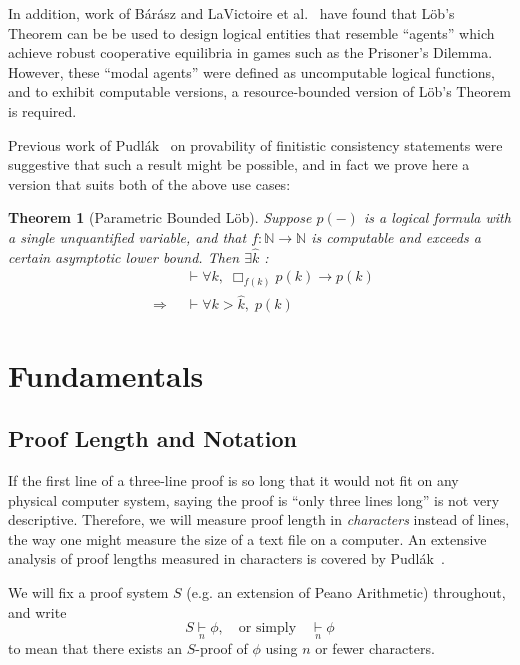 \documentclass[onecolumn]{miri-tech-article}
\newtheorem*{theorem*}{Theorem}
\numberwithin{equation}{section}
\theoremstyle{definition}
\newcommand{\NN}{\mathbb{N}}
\newcommand{\proves}[1]{\underset{#1}{\vdash}}
\newcommand{\bx}[1]{\Box_{#1}}
\renewcommand{\implies}{\rightarrow}
\renewcommand{\to}{\rightarrow}
\newcommand{\Implies}{\;\;\Rightarrow\;\;}
\renewcommand{\-}{^{-1}}
\begin{document}
In addition, work of B\'{a}r\'{a}sz and LaVictoire et al.~\cite{Barasz:2014:RobustCooperation}\cite{LaVictoire:2014:PrisDilemmaLob} have found that L\"{o}b's Theorem can be be used to design logical entities that resemble ``agents'' which achieve robust cooperative equilibria in games such as the Prisoner's Dilemma.  However, these ``modal agents'' were defined as uncomputable logical functions, and to exhibit computable versions, a resource-bounded version of L\"{o}b's Theorem is required.

Previous work of Pudl\'{a}k~\cite{Pudlak:1998} on provability of finitistic consistency statements were suggestive that such a result might be possible, and in fact we prove here a version that suits both of the above use cases:

\begin{theorem*}[Parametric Bounded L\"{o}b]
Suppose $p(-)$ is a logical formula with a single unquantified variable, and that $f:\NN \to \NN$ is computable and  exceeds a certain asymptotic lower bound.  Then $\exists\hat k$ :
\begin{align*}
             &\proves{} \forall k,\; \bx{f(k)}p(k) \implies p(k)\\
\Implies &\proves{} \forall k>\hat k, \; p(k)
\end{align*}
\end{theorem*}



\section{Fundamentals}\label{sec:fund}

\subsection{Proof Length and Notation}
If the first line of a three-line proof is so long that it would not fit on any physical computer system, saying the proof is ``only three lines long'' is not very descriptive.  Therefore, we will measure proof length in {\em characters} instead of lines, the way one might measure the size of a text file on a computer.  An extensive analysis of proof lengths measured in characters is covered by Pudl\'{a}k~\cite{Pudlak:1998}.

We will fix a proof system $S$ (e.g. an extension of Peano Arithmetic) throughout, and write
$$S \proves{n} \phi, \quad \text{or simply} \quad \proves{n} \phi$$
to mean that there exists an $S$-proof of $\phi$ using $n$ or fewer characters.  
\end{document}
